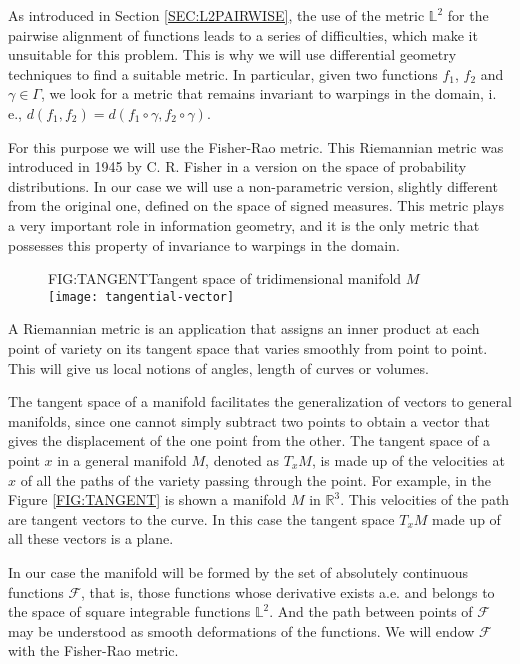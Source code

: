 As introduced in Section \ref{SEC:L2PAIRWISE}, the use of the metric $\mathbb{L}^2$
for the pairwise alignment of functions leads to a series of difficulties, which make
it unsuitable for this problem. This is why we will use differential
geometry techniques to find a suitable metric. In particular, given two
functions $f_1$, $f_2$ and $\gamma \in \Gamma$, we look for a metric that
remains invariant to warpings in the domain, i. e.,
$d(f_1, f_2) = d(f_1 \circ \gamma, f_2 \circ \gamma)$.

For this purpose we will use the Fisher-Rao metric. This Riemannian metric was
introduced in 1945 by C. R. Fisher in a version on the
space of probability distributions. In our case we will use a non-parametric
version, slightly different from the original one, defined on the space of
signed measures. This metric plays a very important role in information
geometry, and it is the only metric that possesses this property of
invariance to warpings in the domain\cite{Cencov1982}.

\begin{figure}[Tangent space of tridimensional manifold]{FIG:TANGENT}{Tangent space of tridimensional manifold $M$ \footnotemark}
	\texttt{[image: tangential-vector]}
\end{figure}


A Riemannian metric is an application that assigns an inner product at each
point of variety on its tangent space that varies smoothly from point to point.
This will give us local notions of angles, length of curves or volumes.

The tangent space of a manifold facilitates the generalization of
vectors to general manifolds, since one
cannot simply subtract two points to obtain a vector that gives the displacement
of the one point from the other. The tangent space of a point $x$ in a general
manifold $M$, denoted as $T_xM$, is made up of the velocities at $x$ of all the
paths of the variety passing through the point. For example, in the Figure
\ref{FIG:TANGENT} is shown a manifold $M$ in $\mathbb{R}^3$. This velocities of
the path are tangent vectors to the curve. In this case the tangent space $T_xM$
made up of all these vectors is a plane.



In our case the manifold will be formed by the set of absolutely continuous
functions $\mathcal{F}$, that is, those functions whose derivative exists a.e.
and belongs to the space of square integrable functions $\mathbb{L}^2$. And
the path between points of $\mathcal{F}$ may be understood as smooth
deformations of the functions.
We will endow $\mathcal{F}$ with the Fisher-Rao metric.

